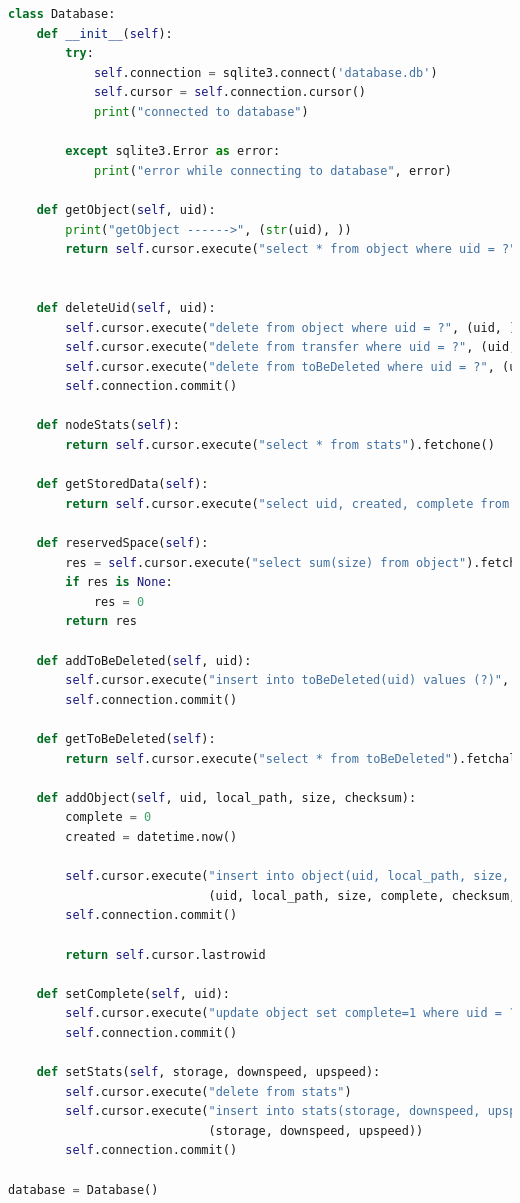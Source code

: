 \documentclass[11pt,a4paper,english]{article}
\begin{document}
\begin{lstlisting}[language=Python, title=Codice]
class Database:
    def __init__(self):
        try:
            self.connection = sqlite3.connect('database.db')
            self.cursor = self.connection.cursor()
            print("connected to database")

        except sqlite3.Error as error:
            print("error while connecting to database", error)

    def getObject(self, uid):
        print("getObject ------>", (str(uid), ))
        return self.cursor.execute("select * from object where uid = ?", (str(uid), )).fetchone()


    def deleteUid(self, uid):
        self.cursor.execute("delete from object where uid = ?", (uid, ))
        self.cursor.execute("delete from transfer where uid = ?", (uid, ))
        self.cursor.execute("delete from toBeDeleted where uid = ?", (uid, ))
        self.connection.commit()

    def nodeStats(self):
        return self.cursor.execute("select * from stats").fetchone()

    def getStoredData(self):
        return self.cursor.execute("select uid, created, complete from object").fetchall()

    def reservedSpace(self):
        res = self.cursor.execute("select sum(size) from object").fetchone()[0]
        if res is None:
            res = 0
        return res

    def addToBeDeleted(self, uid):
        self.cursor.execute("insert into toBeDeleted(uid) values (?)", (uid, ))
        self.connection.commit()

    def getToBeDeleted(self):
        return self.cursor.execute("select * from toBeDeleted").fetchall()

    def addObject(self, uid, local_path, size, checksum):
        complete = 0
        created = datetime.now()

        self.cursor.execute("insert into object(uid, local_path, size, complete, checksum, created) values (?, ?, ?, ?, ?, ?)",
                            (uid, local_path, size, complete, checksum, created))
        self.connection.commit()

        return self.cursor.lastrowid

    def setComplete(self, uid):
        self.cursor.execute("update object set complete=1 where uid = ?", (uid, ))
        self.connection.commit()

    def setStats(self, storage, downspeed, upspeed):
        self.cursor.execute("delete from stats")
        self.cursor.execute("insert into stats(storage, downspeed, upspeed) values (?, ?, ?)",
                            (storage, downspeed, upspeed))
        self.connection.commit()

database = Database()
\end{lstlisting}
\end{document}
